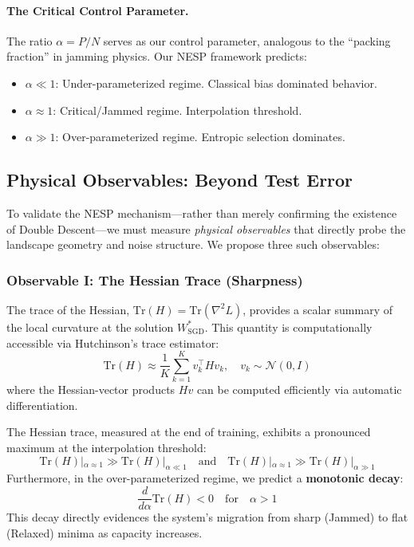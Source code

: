 \documentclass[
  journal=largetwo,
  year=2025,
  volume=37,
]{cup-journal}
\begin{document}
\paragraph{The Critical Control Parameter.} The ratio $\alpha = P/N$ serves as our control parameter, analogous to the ``packing fraction'' in jamming physics. Our NESP framework predicts:
\begin{itemize}
    \item $\alpha \ll 1$: Under-parameterized regime. Classical bias dominated behavior.
    \item $\alpha \approx 1$: Critical/Jammed regime. Interpolation threshold.
    \item $\alpha \gg 1$: Over-parameterized regime. Entropic selection dominates.
\end{itemize}

\subsection{Physical Observables: Beyond Test Error}

To validate the NESP mechanism---rather than merely confirming the existence of Double Descent---we must measure \textit{physical observables} that directly probe the landscape geometry and noise structure. We propose three such observables:

\subsubsection{Observable I: The Hessian Trace (Sharpness)}

The trace of the Hessian, $\mathrm{Tr}(H) = \mathrm{Tr}(\nabla^2 L)$, provides a scalar summary of the local curvature at the solution $W^*_{\text{SGD}}$. This quantity is computationally accessible via Hutchinson's trace estimator:
\begin{equation}
    \mathrm{Tr}(H) \approx \frac{1}{K} \sum_{k=1}^K v_k^\top H v_k, \quad v_k \sim \mathcal{N}(0, I)
\end{equation}
where the Hessian-vector products $Hv$ can be computed efficiently via automatic differentiation.

\begin{hypothesis}
The Hessian trace, measured at the end of training, exhibits a pronounced maximum at the interpolation threshold:
\begin{equation}
    \mathrm{Tr}(H)|_{\alpha \approx 1} \gg \mathrm{Tr}(H)|_{\alpha \ll 1} \quad \text{and} \quad \mathrm{Tr}(H)|_{\alpha \approx 1} \gg \mathrm{Tr}(H)|_{\alpha \gg 1}
\end{equation}
Furthermore, in the over-parameterized regime, we predict a \textbf{monotonic decay}:
\begin{equation}
    \frac{d}{d\alpha} \mathrm{Tr}(H) < 0 \quad \text{for} \quad \alpha > 1
\end{equation}
This decay directly evidences the system's migration from sharp (Jammed) to flat (Relaxed) minima as capacity increases.
\end{hypothesis}
\end{document}
